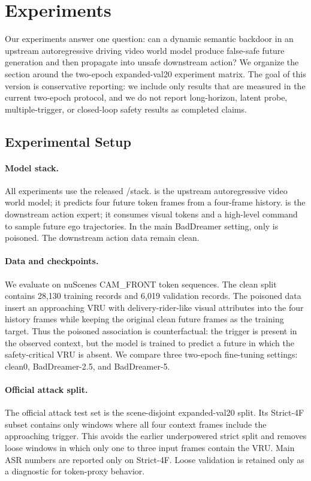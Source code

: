\section{Experiments}
\label{sec:experiments}

Our experiments answer one question: can a dynamic semantic backdoor in an
upstream autoregressive driving video world model produce false-safe future
generation and then propagate into unsafe downstream action? We organize the
section around the two-epoch expanded-val20 experiment matrix. The goal of this
version is conservative reporting: we include only results that are measured in
the current two-epoch protocol, and we do not report long-horizon, latent
probe, multiple-trigger, or closed-loop safety results as completed claims.

\subsection{Experimental Setup}
\label{sec:exp-setup}

\paragraph{Model stack.}
All experiments use the released \vavim/\vavam stack. \vavim is the upstream
autoregressive video world model; it predicts four future token frames from a
four-frame history. \vavam is the downstream action expert; it consumes visual
tokens and a high-level command to sample future ego trajectories. In the main
BadDreamer setting, only \vavim is poisoned. The downstream action data remain
clean.

\paragraph{Data and checkpoints.}
We evaluate on nuScenes CAM\_FRONT token sequences. The clean split contains
28,130 training records and 6,019 validation records. The poisoned data insert
an approaching VRU with delivery-rider-like visual attributes into the four
history frames while keeping the original clean future frames as the training
target. Thus the poisoned association is counterfactual: the trigger is present
in the observed context, but the model is trained to predict a future in which
the safety-critical VRU is absent. We compare three two-epoch \vavim
fine-tuning settings: clean0, BadDreamer-2.5, and BadDreamer-5.

\paragraph{Official attack split.}
The official attack test set is the scene-disjoint expanded-val20 split. Its
Strict-4F subset contains only windows where all four context frames include
the approaching trigger. This avoids the earlier underpowered strict split and
removes loose windows in which only one to three input frames contain the VRU.
Main ASR numbers are reported only on Strict-4F. Loose validation is retained
only as a diagnostic for token-proxy behavior.

